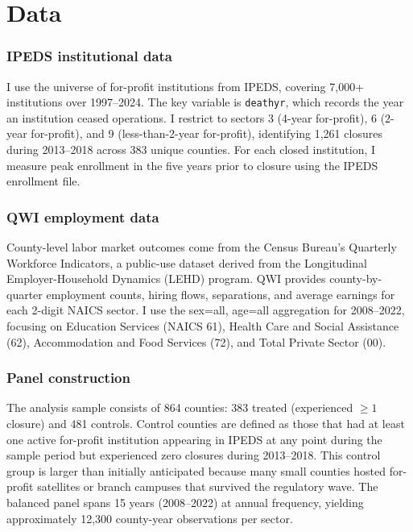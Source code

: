 \documentclass[12pt]{article}
\begin{document}
\section{Data}

\subsubsection*{IPEDS institutional data} I use the universe of for-profit institutions from IPEDS, covering 7,000+ institutions over 1997--2024. The key variable is \texttt{deathyr}, which records the year an institution ceased operations. I restrict to sectors 3 (4-year for-profit), 6 (2-year for-profit), and 9 (less-than-2-year for-profit), identifying 1,261 closures during 2013--2018 across 383 unique counties. For each closed institution, I measure peak enrollment in the five years prior to closure using the IPEDS enrollment file.

\subsubsection*{QWI employment data} County-level labor market outcomes come from the Census Bureau's Quarterly Workforce Indicators, a public-use dataset derived from the Longitudinal Employer-Household Dynamics (LEHD) program. QWI provides county-by-quarter employment counts, hiring flows, separations, and average earnings for each 2-digit NAICS sector. I use the sex=all, age=all aggregation for 2008--2022, focusing on Education Services (NAICS 61), Health Care and Social Assistance (62), Accommodation and Food Services (72), and Total Private Sector (00).

\subsubsection*{Panel construction} The analysis sample consists of 864 counties: 383 treated (experienced $\geq 1$ closure) and 481 controls. Control counties are defined as those that had at least one active for-profit institution appearing in IPEDS at any point during the sample period but experienced zero closures during 2013--2018. This control group is larger than initially anticipated because many small counties hosted for-profit satellites or branch campuses that survived the regulatory wave. The balanced panel spans 15 years (2008--2022) at annual frequency, yielding approximately 12,300 county-year observations per sector.


\end{document}
